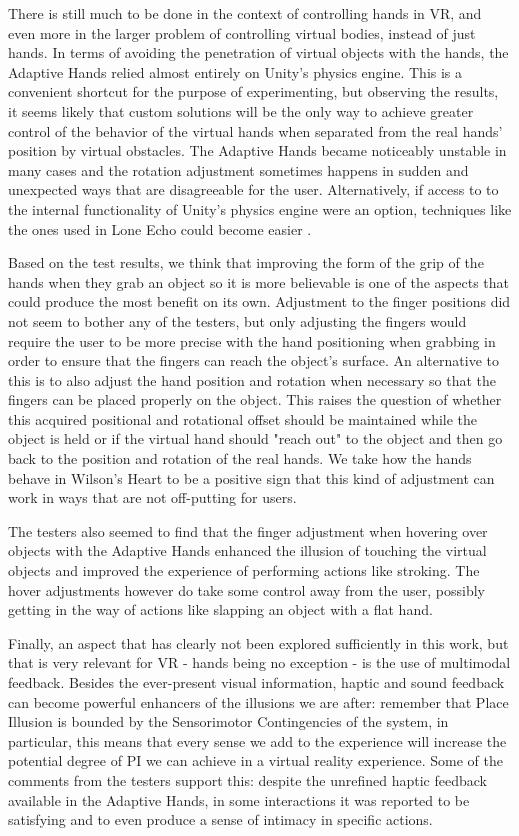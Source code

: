 There is still much to be done in the context of controlling hands in VR, and even more in the larger problem of controlling virtual bodies, instead of just hands. In terms of avoiding the penetration of virtual objects with the hands, the Adaptive Hands relied almost entirely on Unity's physics engine. This is a convenient shortcut for the purpose of experimenting, but observing the results, it seems likely that custom solutions will be the only way to achieve greater control of the behavior of the virtual hands when separated from the real hands' position by virtual obstacles. The Adaptive Hands became noticeably unstable in many cases and the rotation adjustment sometimes happens in sudden and unexpected ways that are disagreeable for the user. Alternatively, if access to to the internal functionality of Unity's physics engine were an option, techniques like the ones used in Lone Echo could become easier \parencite{loneEchoVideo}.

Based on the test results, we think that improving the form of the grip of the hands when they grab an object so it is more believable is one of the aspects that could produce the most benefit on its own. Adjustment to the finger positions did not seem to bother any of the testers, but only adjusting the fingers would require the user to be more precise with the hand positioning when grabbing in order to ensure that the fingers can reach the object's surface. An alternative to this is to also adjust the hand position and rotation when necessary so that the fingers can be placed properly on the object. This raises the question of whether this acquired positional and rotational offset should be maintained while the object is held or if the virtual hand should "reach out" to the object and then go back to the position and rotation of the real hands. We take how the hands behave in Wilson's Heart to be a positive sign that this kind of adjustment can work in ways that are not off-putting for users.

The testers also seemed to find that the finger adjustment when hovering over objects with the Adaptive Hands enhanced the illusion of touching the virtual objects and improved the experience of performing actions like stroking. The hover adjustments however do take some control away from the user, possibly getting in the way of actions like slapping an object with a flat hand.

Finally, an aspect that has clearly not been explored sufficiently in this work, but that is very relevant for VR - hands being no exception - is the use of multimodal feedback. Besides the ever-present visual information, haptic and sound feedback can become powerful enhancers of the illusions we are after: remember that Place Illusion is bounded by the Sensorimotor Contingencies of the system, in particular, this means that every sense we add to the experience will increase the potential degree of PI we can achieve in a virtual reality experience. Some of the comments from the testers support this: despite the unrefined haptic feedback available in the Adaptive Hands, in some interactions it was reported to be satisfying and to even produce a sense of intimacy in specific actions.
